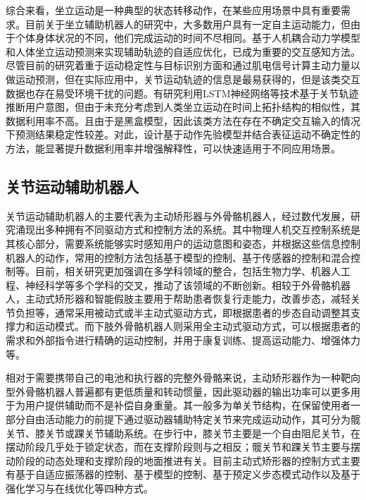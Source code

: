 综合来看，坐立运动是一种典型的状态转移动作，在某些应用场景中具有重要需求。目前关于坐立辅助机器人的研究中，大多数用户具有一定自主运动能力，但由于个体身体状况的不同，他们完成运动的时间不尽相同。基于人机耦合动力学模型和人体坐立运动预测来实现辅助轨迹的自适应优化，已成为重要的交互感知方法。尽管目前的研究着重于运动稳定性与目标识别方面和通过肌电信号计算主动力量以做运动预测，但在实际应用中，关节运动轨迹的信息是最易获得的，但是该类交互数据也存在易受环境干扰的问题。有研究利用LSTM神经网络等技术基于关节轨迹推断用户意图，但由于未充分考虑到人类坐立运动在时间上拓扑结构的相似性，其数据利用率不高。且由于是黑盒模型，因此该类方法在存在不确定交互输入的情况下预测结果稳定性较差。对此，设计基于动作先验模型并结合表征运动不确定性的方法，能显著提升数据利用率并增强解释性，可以快速适用于不同应用场景。

\subsection{关节运动辅助机器人}
关节运动辅助机器人的主要代表为主动矫形器与外骨骼机器人，经过数代发展，研究涌现出多种拥有不同驱动方式和控制方法的系统。其中物理人机交互控制系统是其核心部分，需要系统能够实时感知用户的运动意图和姿态，并根据这些信息控制机器人的动作，常用的控制方法包括基于模型的控制、基于传感器的控制和混合控制等。目前，相关研究更加强调在多学科领域的整合，包括生物力学、机器人工程、神经科学等多个学科的交叉，推动了该领域的不断创新。相较于外骨骼机器人，主动式矫形器和智能假肢主要用于帮助患者恢复行走能力，改善步态，减轻关节负担等，通常采用被动式或半主动式驱动方式，即根据患者的步态自动调整其支撑力和运动模式。而下肢外骨骼机器人则采用全主动式驱动方式，可以根据患者的需求和外部指令进行精确的运动控制，并用于康复训练、提高运动能力、增强体力等。

相对于需要携带自己的电池和执行器的完整外骨骼来说，主动矫形器作为一种靶向型外骨骼机器人普遍都有更低质量和转动惯量，因此驱动器的输出功率可以更多用于为用户提供辅助而不是补偿自身重量\cite{collinsReducingEnergyCost2015,zhangHumanintheloopOptimizationExoskeleton2017a}。其一般多为单关节结构，在保留使用者一部分自由活动能力的前提下通过驱动器辅助特定关节来完成运动动作，其可分为髋关节、膝关节或踝关节辅助系统\cite{malcolmExperimentalStudyRole2009}。在步行中，膝关节主要是一个自由阻尼关节，在摆动阶段几乎处于锁定状态，而在支撑阶段则与之相反；髋关节和踝关节主要与摆动阶段的动态处理和支撑阶段的地面推进有关。目前主动式矫形器的控制方式主要有基于自适应振荡器的控制、基于模型的控制、基于预定义步态模式动作以及基于强化学习与在线优化等四种方式\cite{yanReviewAssistiveStrategies2015}。

